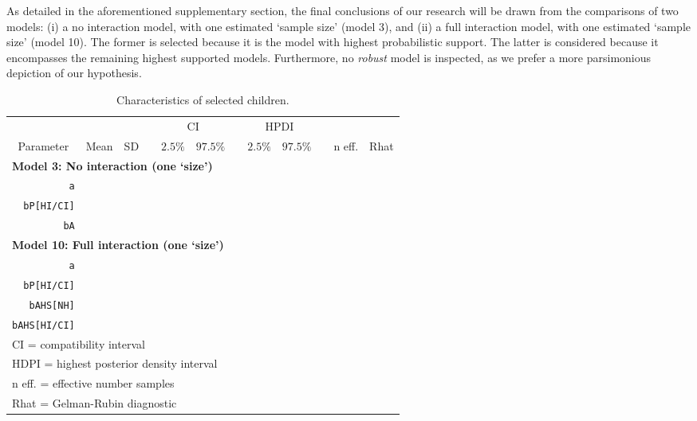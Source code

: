As detailed in the aforementioned supplementary section, the final conclusions of our research will be drawn from the comparisons of two models: (i) a no interaction model, with one estimated `sample size' (model 3), and (ii) a full interaction model, with one estimated `sample size' (model 10). The former is selected because it is the model with highest probabilistic support. The latter is considered because it encompasses the remaining highest supported models. Furthermore, no \textit{robust} model is inspected, as we prefer a more parsimonious depiction of our hypothesis.
%
\begin{table}[h!]
	\centering
	\begin{tabular}{|cccccccccccc|} 
		\hline
		& \multicolumn{3}{c}{} & \multicolumn{2}{c}{CI} & & \multicolumn{2}{c}{HPDI} & & \multicolumn{2}{c|}{}\\[0.5ex]
		\cline{5-6} \cline{8-9}
		Parameter & Mean & SD & & $2.5\%$ & $97.5\%$ & & $2.5\%$ & $97.5\%$ & & n eff. & Rhat \\[0.5ex] 
		\hline\hline
		\multicolumn{12}{|l|}{ \textbf{Model 3: No interaction (one `size')} } \\
		\multicolumn{1}{|r}{ \texttt{a} } & & & & & & & & & & & \\
		\multicolumn{1}{|r}{ \texttt{bP[HI/CI]} } & & & & & & & & & & & \\
		\multicolumn{1}{|r}{ \texttt{bA} } & & & & & & & & & & & \\
		\hline
		\multicolumn{12}{|l|}{ \textbf{Model 10: Full interaction (one `size')} } \\
		\multicolumn{1}{|r}{ \texttt{a} } & & & & & & & & & & & \\
		\multicolumn{1}{|r}{ \texttt{bP[HI/CI]} } & & & & & & & & & & & \\
		\multicolumn{1}{|r}{ \texttt{bAHS[NH]} } & & & & & & & & & & & \\
		\multicolumn{1}{|r}{ \texttt{bAHS[HI/CI]} } & & & & & & & & & & & \\
		\hline
		\multicolumn{12}{l}{\footnotesize{CI = compatibility interval}} \\
		\multicolumn{12}{l}{\footnotesize{HDPI = highest posterior density interval}} \\
		\multicolumn{12}{l}{\footnotesize{n eff. = effective number samples}} \\
		\multicolumn{12}{l}{\footnotesize{Rhat = Gelman-Rubin diagnostic}} \\
	\end{tabular}
	\caption[Characteristics of selected children]{Characteristics of selected children.}
	\label{tab:characteristics}
\end{table}

